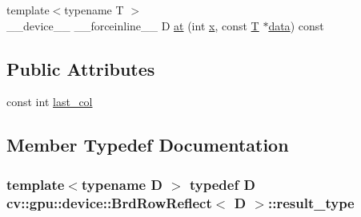 \begin{DoxyCompactItemize}
\item 
{\footnotesize template$<$typename T $>$ }\\\-\_\-\-\_\-device\-\_\-\-\_\- \-\_\-\-\_\-forceinline\-\_\-\-\_\- D \hyperlink{structcv_1_1gpu_1_1device_1_1BrdRowReflect_a59593cabed460b1bad4cf7d031aba607}{at} (int \hyperlink{highgui__c_8h_a6150e0515f7202e2fb518f7206ed97dc}{x}, const \hyperlink{calib3d_8hpp_a3efb9551a871ddd0463079a808916717}{T} $\ast$\hyperlink{legacy_8hpp_ab9fe6c09e6d02865a953fffc12fe6ca0}{data}) const 
\end{DoxyCompactItemize}
\subsection*{Public Attributes}
\begin{DoxyCompactItemize}
\item 
const int \hyperlink{structcv_1_1gpu_1_1device_1_1BrdRowReflect_aed0324fea711290e56ae24adfeea4ca7}{last\-\_\-col}
\end{DoxyCompactItemize}


\subsection{Member Typedef Documentation}
\hypertarget{structcv_1_1gpu_1_1device_1_1BrdRowReflect_a934c04004c9fe9ed336e992db3abe8fd}{
\subsubsection[{result\-\_\-type}]{\setlength{\rightskip}{0pt plus 5cm}template$<$typename D $>$ typedef D {\bf cv\-::gpu\-::device\-::\-Brd\-Row\-Reflect}$<$ D $>$\-::{\bf result\-\_\-type}}}\label{structcv_1_1gpu_1_1device_1_1BrdRowReflect_a934c04004c9fe9ed336e992db3abe8fd}


